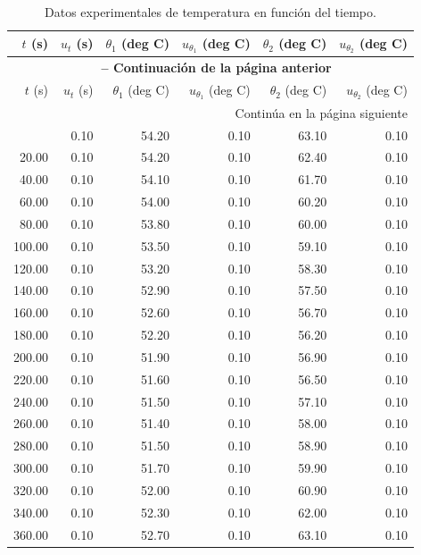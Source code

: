 \documentclass[a4paper,11pt]{article}
\begin{document}
\begin{longtable}{rrrrrr}
    \caption{Datos experimentales de temperatura en función del tiempo.} \label{tab:raw_data} \\
    \toprule
    {$t$ (s)} & {$u_t$ (s)} & {$\theta_1$ (deg C)} & {$u_{\theta_1}$ (deg C)} & {$\theta_2$ (deg C)} & {$u_{\theta_2}$ (deg C)} \\
    \midrule
    \endfirsthead
    \multicolumn{6}{c}{{\bfseries \tablename\ \thetable{} -- Continuación de la página anterior}} \\
    \toprule
    {$t$ (s)} & {$u_t$ (s)} & {$\theta_1$ (deg C)} & {$u_{\theta_1}$ (deg C)} & {$\theta_2$ (deg C)} & {$u_{\theta_2}$ (deg C)} \\
    \midrule
    \endhead
    \midrule
    \multicolumn{6}{r}{{Continúa en la página siguiente}} \\
    \endfoot
    \bottomrule
    \endlastfoot
    0.00 & 0.10 & 54.20 & 0.10 & 63.10 & 0.10 \\
    20.00 & 0.10 & 54.20 & 0.10 & 62.40 & 0.10 \\
    40.00 & 0.10 & 54.10 & 0.10 & 61.70 & 0.10 \\
    60.00 & 0.10 & 54.00 & 0.10 & 60.20 & 0.10 \\
    80.00 & 0.10 & 53.80 & 0.10 & 60.00 & 0.10 \\
    100.00 & 0.10 & 53.50 & 0.10 & 59.10 & 0.10 \\
    120.00 & 0.10 & 53.20 & 0.10 & 58.30 & 0.10 \\
    140.00 & 0.10 & 52.90 & 0.10 & 57.50 & 0.10 \\
    160.00 & 0.10 & 52.60 & 0.10 & 56.70 & 0.10 \\
    180.00 & 0.10 & 52.20 & 0.10 & 56.20 & 0.10 \\
    200.00 & 0.10 & 51.90 & 0.10 & 56.90 & 0.10 \\
    220.00 & 0.10 & 51.60 & 0.10 & 56.50 & 0.10 \\
    240.00 & 0.10 & 51.50 & 0.10 & 57.10 & 0.10 \\
    260.00 & 0.10 & 51.40 & 0.10 & 58.00 & 0.10 \\
    280.00 & 0.10 & 51.50 & 0.10 & 58.90 & 0.10 \\
    300.00 & 0.10 & 51.70 & 0.10 & 59.90 & 0.10 \\
    320.00 & 0.10 & 52.00 & 0.10 & 60.90 & 0.10 \\
    340.00 & 0.10 & 52.30 & 0.10 & 62.00 & 0.10 \\
    360.00 & 0.10 & 52.70 & 0.10 & 63.10 & 0.10 \\

\end{longtable}
\end{document}
